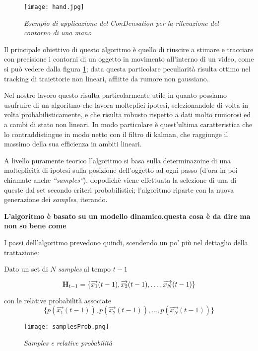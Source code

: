 \begin{figure}[hb]
\centering
	\texttt{[image: hand.jpg]}
\caption{\textit{Esempio di applicazione del ConDensation per la rilevazione del contorno di una mano}\label{fig:hand}}
\end{figure}

Il principale obiettivo di questo algoritmo è quello di riuscire a stimare e tracciare con precisione i contorni di un oggetto in movimento all'interno di un video, come si può vedere dalla figura \ref{fig:hand}; data questa particolare peculiarità risulta ottimo nel tracking di traiettorie non lineari, afflitte da rumore non gaussiano.

Nel nostro lavoro questo risulta particolarmente utile in quanto possiamo usufruire di un algoritmo che lavora molteplici ipotesi, selezionandole di volta in volta probabilisticamente, e che risulta robusto rispetto a dati molto rumorosi ed a cambi di stato non lineari. In modo particolare è quest'ultima caratteristica che lo contraddistingue in modo netto con il filtro di kalman, che raggiunge il massimo della sua efficienza in ambiti lineari.

A livello puramente teorico l'algoritmo si basa sulla determinazoine di una molteplicità di ipotesi sulla posizione dell'oggetto ad ogni passo (d'ora in poi chiamate anche \textit{``samples''}), dopodichè viene effettuata la selezione di una di queste dal set secondo criteri probabilistici; l'algoritmo riparte con la nuova generazione dei \textit{samples}, iterando. 

\textbf{L'algoritmo è basato su un modello dinamico.questa cosa è da dire ma non so bene come}


I passi dell'algoritmo prevedono quindi, scendendo un po' più nel dettaglio della trattazione: 

Dato un set di $N$ \textit{samples} al tempo $t-1$

\begin{equation}\label{eq:H}
\mbox{{\bfseries H}}_{t-1}= \lbrace \overrightarrow{x_1}(t-1),\overrightarrow{x_2}(t-1), \ldots,  \overrightarrow{x_N}(t-1) \rbrace
\end{equation} 

con le relative probabilità associate
\begin{equation}\label{eq:pH}
\lbrace p(\overrightarrow{x_1}(t-1)),p(\overrightarrow{x_2}(t-1)), \ldots, p( \overrightarrow{x_N}(t-1)) \rbrace
\end{equation} 

\begin{figure}[hb]
\centering
	\texttt{[image: samplesProb.png]}
\caption{\textit{Samples e relative probabilità}\label{fig:samplesProb}}
\end{figure}

